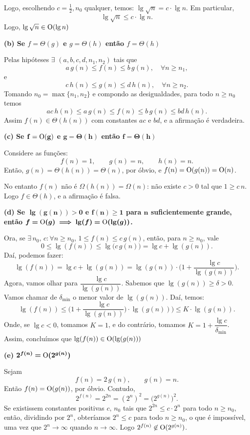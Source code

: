 \documentclass[a4paper]{article}
\begin{document}
Logo, escolhendo $c= \frac 12, n_0$ qualquer, temos: $\lg\sqrt{n} = c\cdot \lg n$. Em particular,
\[ \lg \sqrt n \le c \cdot \lg n. \]
Logo, $\lg\sqrt{n} \in \text O(\lg n)$

\bigskip

\textbf{(b) Se $f=\Theta(g)$ e $g=\Theta(h)$ então $f=\Theta(h)$}

Pelas hipóteses $\exists$ $(a,b,c,d,n_1,n_2)$ tais que
\[ a\,g(n)\le f(n)\le b\,g(n), \quad \forall n \ge n_1, \]
e
\[ c\,h(n)\le g(n)\le d\,h(n), \quad \forall n \ge n_2. \]
Tomando \(n_0=\max\{n_1,n_2\}\) e compondo as desigualdades, para todo \(n\ge n_0\) temos
\[ ac\,h(n) \le a\,g(n) \le f(n) \le b\,g(n) \le bd\,h(n). \]
Assim \(f(n) \in \Theta(h(n))\) com constantes \(ac\) e \(bd\), e a afirmação é verdadeira.

\bigskip

\textbf{(c) Se $\bf{f=\text O(g)}$ e $\bm{g=\Theta(h)}$ então $\bm{f=\Theta(h)}$}

Considere as funções:
\[ f(n)=1,\qquad g(n)=n,\qquad h(n)=n. \]
Então, $g(n)=\Theta(h(n))=\Theta(n)$, por óbvio, e $f(n)=\text O(g(n))=\text O(n)$.

No entanto $f(n)$ não é $\Omega(h(n)) = \Omega(n)$: não existe $c>0$ tal que $1 \ge c\,n$. Logo $f \in \Theta(h)$, e a afirmação é falsa.

\bigskip

\textbf{(d) Se $\bm{\lg(g(n))>0}$ e $\bm{f(n)\ge 1}$ para $\bm n$ suficientemente grande, então $\bm{f=\text O(g) \implies \lg(f) = \text O(\lg(g))}$.
}

Ora, se $\exists \, n_0, \, c : \forall n \ge n_0$, $1 \le f(n)\le c\,g(n)$, então, para \(n\ge n_0\), vale
\[ 0 \le \lg(f(n)) \le \lg\big(c\,g(n)\big)=\lg c + \lg(g(n)). \]
Daí, podemos fazer:
\[ \lg(f(n)) = \lg c + \lg(g(n)) = \lg (g(n)) \cdot \Big( 1 + \frac{\lg c}{\lg (g(n))} \Big). \]
Agora, vamos olhar para $\dfrac{\lg c}{\lg(g(n))}$. Sabemos que $\lg(g(n)) \ge \delta > 0$. Vamos chamar de $\delta_{\text{min}}$ o menor valor de $\lg(g(n))$. Daí, temos:
\[ \lg(f(n)) \le \Big( 1 + \frac{\lg c}{\lg(g(n))}\Big) \cdot \lg(g(n))) \le K \cdot \lg(g(n)). \]
Onde, se $\lg c < 0$, tomamos $K=1$, e do contrário, tomamos $K=1+\dfrac{\lg c}{\delta_{\text{min}}}$. Assim, concluímos que $\lg(f(n)) \in \text O(\lg(g(n)))$

\bigskip

\textbf{(e) $\bm{2^{f(n)}=\text O(2^{g(n)})}$}

Sejam
\[ f(n)=2\,g(n), \qquad g(n)=n. \]
Então $f(n)=\text O(g(n))$, por óbvio. Contudo,
\[ 2^{f(n)}=2^{2n}=(2^{n})^2= \big(2^{g(n)}\big)^2. \]
Se existissem constantes positivas $c, \, n_0$ tais que $2^{2n} \le c \cdot 2^{n}$ para todo $n\ge n_0$, então, dividindo por $2^n$, obteríamos $2^n\le c$ para todo $n\ge n_0$, o que é impossível, uma vez que $2^n \to \infty$ quando $n \to \infty$. Logo $2^{f(n)} \not \in \text O(2^{g(n)})$.
\end{document}
